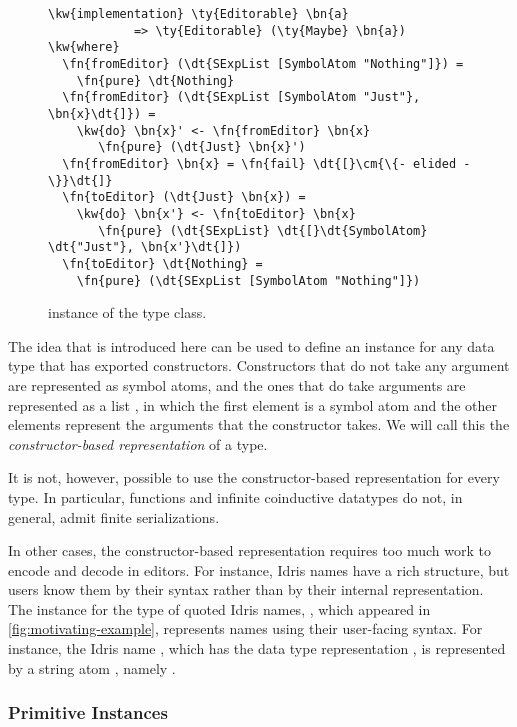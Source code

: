 \begin{figure}[H]
\begin{Verbatim}
\kw{implementation} \ty{Editorable} \bn{a}
            => \ty{Editorable} (\ty{Maybe} \bn{a}) \kw{where}
  \fn{fromEditor} (\dt{SExpList [SymbolAtom "Nothing"]}) =
    \fn{pure} \dt{Nothing}
  \fn{fromEditor} (\dt{SExpList [SymbolAtom "Just"}, \bn{x}\dt{]}) =
    \kw{do} \bn{x}' <- \fn{fromEditor} \bn{x}
       \fn{pure} (\dt{Just} \bn{x}')
  \fn{fromEditor} \bn{x} = \fn{fail} \dt{[}\cm{\{- elided -\}}\dt{]}
  \fn{toEditor} (\dt{Just} \bn{x}) =
    \kw{do} \bn{x'} <- \fn{toEditor} \bn{x}
       \fn{pure} (\dt{SExpList} \dt{[}\dt{SymbolAtom} \dt{"Just"}, \bn{x'}\dt{]})
  \fn{toEditor} \dt{Nothing} =
    \fn{pure} (\dt{SExpList [SymbolAtom "Nothing"]})
\end{Verbatim}
\label{code:editorableMaybe}
\caption{ instance of the  type class.}
\end{figure}

The idea that is introduced here can be used to define an \Editorable{}
instance for any data type that has exported constructors. Constructors that do
not take any argument are represented as symbol atoms, and the ones that do
take arguments are represented as a list \sexp{}, in which the first element is
a symbol atom and the other elements represent the arguments that the
constructor takes. We will call this the \emph{constructor-based \sexp{}
representation} of a type.

It is not, however, possible to use the constructor-based representation for every type.
In particular, functions and infinite coinductive datatypes do not, in general, admit finite serializations.

In other cases, the constructor-based representation requires too much work to encode and decode in editors.
For instance, Idris names have a rich structure, but users know them by their syntax rather than by their internal representation.
The \Editorable{} instance for the type of quoted Idris
names, , which appeared in \autoref{fig:motivating-example}, represents names using their user-facing syntax.
For instance, the Idris name , which has the
data type representation , is
represented by a string atom \sexp{}, namely .

\subsubsection{Primitive \Editorable{} Instances}

